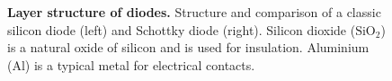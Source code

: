 \begin{figure}[H]
    \renewcommand{\figurename}{Figure}
    \centering
    \begin{minipage}[c]{0.49\textwidth}
        \centering
        
    \end{minipage}
    \begin{minipage}[c]{0.49\textwidth}
        \centering
        
    \end{minipage}
    
    \label{fig:SchichtaufbauVonDioden}
    \caption{\textbf{Layer structure of diodes.} Structure and comparison of a classic silicon diode (left)
        and Schottky diode (right). Silicon dioxide ($\mathrm{SiO_2}$) is a natural oxide of silicon and is used for insulation. Aluminium (Al) is a typical metal for electrical contacts.        }
\end{figure}

%
%
%
%

